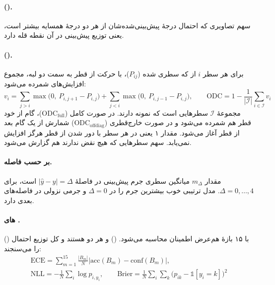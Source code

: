 \paragraph{ ().} سهم تصاویری که احتمال درجهٔ پیش‌بینی‌شده‌شان از هر دو درجهٔ همسایه بیشتر است، یعنی توزیع پیش‌بینی در آن نقطه قله دارد.

\paragraph{ ().} برای هر سطر $i$ از  که  سطری شده ($P_{ij}$)، با حرکت از قطر به سمت دو لبه، مجموع افزایش‌های  شمرده می‌شود:
\begin{equation}
v_i = \sum_{j > i} \max\!\big(0,\ P_{i,j+1} - P_{i,j}\big) + \sum_{j < i} \max\!\big(0,\ P_{i,j-1} - P_{i,j}\big), \qquad \mathrm{ODC} = 1 - \frac{1}{|\mathcal{I}|} \sum_{i \in \mathcal{I}} v_i
\end{equation}
مجموعهٔ $\mathcal{I}$ سطرهایی است که نمونه دارند. در صورت کامل ($\mathrm{ODC}_{\mathrm{full}}$)، گام از خود قطر هم شمرده می‌شود و در صورت خارج‌قطری ($\mathrm{ODC}_{\mathrm{offdiag}}$) شمارش از یک گام بعد از قطر آغاز می‌شود. مقدار ۱ یعنی در هر سطر  با دور شدن از قطر هرگز افزایش نمی‌یابد. سهم سطرهایی که هیچ نقض ندارند هم گزارش می‌شود.

\paragraph{ بر حسب فاصله.} مقدار $m_\Delta$ میانگین سطری جرم پیش‌بینی در فاصلهٔ $|\hat{y} - y| = \Delta$ است، برای $\Delta = 0,\dots,4$. مدل ترتیبی خوب بیشترین جرم را در $\Delta=0$ و جرمی نزولی در فاصله‌های بعدی دارد.

\paragraph{های .}  () با ۱۵ بازهٔ هم‌عرض اطمینان محاسبه می‌شود.  () و  هر دو  هستند و کل توزیع احتمال را می‌سنجند:
\begin{equation}
\begin{gathered}
\mathrm{ECE} = \sum_{m=1}^{15} \frac{|B_m|}{N} \big| \mathrm{acc}(B_m) - \mathrm{conf}(B_m) \big|,\\
\mathrm{NLL} = -\frac{1}{N} \sum_i \log p_{i, y_i}, \qquad \mathrm{Brier} = \frac{1}{N} \sum_i \sum_k \big(p_{ik} - \mathbb{1}[y_i = k]\big)^2
\end{gathered}
\end{equation}

